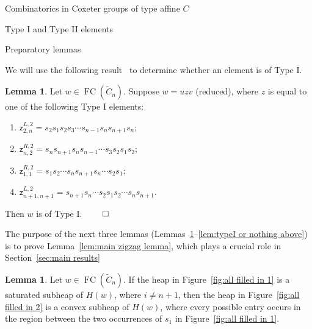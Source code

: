 \documentclass[11pt]{amsart}
\theoremstyle{definition}
\newtheorem{lemma}[theorem]{Lemma}
\numberwithin{equation}{section}
\newcommand{\C}{\widetilde{C}}
\newcommand{\z}{\mathsf{z}}
\renewcommand{\(}{\left(}
\renewcommand{\)}{\right)}
\DeclareMathOperator{\FC}{FC}
\begin{document}
\begin{section}{Combinatorics in Coxeter groups of type affine $C$}
\begin{subsection}{Type I and Type II elements}
\end{subsection}


\begin{subsection}{Preparatory lemmas}\label{subsec:prep lemmas}  

We will use the following result~\cite[Lemma 5.2.1]{Ernst2010} to determine whether an element is of Type I.

\begin{lemma}\label{lem:zigzag}
Let $w \in \FC(\C_{n})$. Suppose $w=uzv$ (reduced), where $z$ is equal to one of the following Type I elements:  
\begin{enumerate}[label=\rm{(\arabic*)}]
\item $\z^{L,2}_{2,n}=s_{2}s_{1}s_{2}s_{3} \cdots s_{n-1}s_{n}s_{n+1}s_{n}$;
\item $\z^{R,2}_{n,2}=s_{n}s_{n+1}s_{n}s_{n-1}\cdots s_{3}s_{2}s_{1}s_{2}$;
\item $\z^{R,2}_{1,1}=s_{1}s_{2}\cdots s_{n}s_{n+1}s_{n}\cdots s_{2}s_{1}$;
\item $\z^{L,2}_{n+1,n+1}=s_{n+1}s_{n}\cdots s_{2}s_{1}s_{2}\cdots s_{n}s_{n+1}$.
\end{enumerate}
Then $w$ is of Type I. \hfill $\qed$
\end{lemma}

The purpose of the next three lemmas (Lemmas~\ref{lem:all filled in}--\ref{lem:typeI or nothing above}) is to prove Lemma~\ref{lem:main zigzag lemma}, which plays a crucial role in Section~\ref{sec:main results}

\begin{lemma}\label{lem:all filled in}
Let $w \in \FC(\C_{n})$.  If the heap in Figure~\ref{fig:all filled in 1} is a saturated subheap of $H(w)$, where $i \neq n+1$, then the heap in Figure~\ref{fig:all filled in 2} is a convex subheap of $H(w)$, where every possible entry occurs in the region between the two occurrences of $s_1$ in Figure~\ref{fig:all filled in 1}.
\end{lemma}


\end{subsection}
\end{section}
\end{document}
